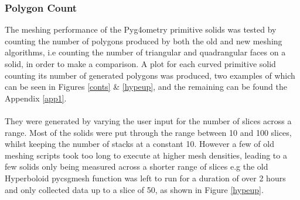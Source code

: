 \documentclass[12pt,a4paper]{article}
\begin{document}
\subsubsection{Polygon Count}
The meshing performance of the Pyg4ometry primitive solids was tested by counting the number of polygons produced by both the old and new meshing algorithms, i.e counting the number of triangular and quadrangular faces on a solid, in order to make a comparison. A plot for each curved primitive solid counting its number of generated polygons was produced, two examples of which can be seen in Figures \ref{conts} \& \ref{hypeup}, and the remaining can be found the Appendix \ref{app1}.
\\\\
They were generated by varying the user input for the number of slices across a range. Most of the solids were put through the range between 10 and 100 slices, whilst keeping the number of stacks at a constant 10. However a few of old meshing scripts took too long to execute at higher mesh densities, leading to a few solids only being measured across a shorter range of slices e.g the old Hyperboloid pycsgmesh function was left to run for a duration of over 2 hours and only collected data up to a slice of 50, as shown in Figure \ref{hypeup}.  \\
\end{document}
